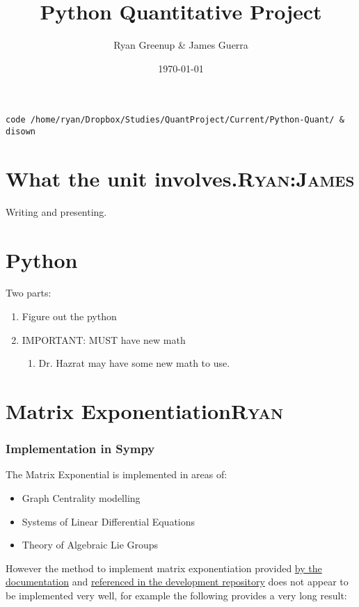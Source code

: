 \documentclass[11pt]{article}
\author{Ryan Greenup \& James Guerra}
\date{\today}
\title{Python Quantitative Project}
\begin{document}
\maketitle
\tableofcontents

\begin{verbatim}
code /home/ryan/Dropbox/Studies/QuantProject/Current/Python-Quant/ & disown
\end{verbatim}

\section[What the unit involves.]{What the unit involves.\hfill{}\textsc{Ryan:James}}
\label{sec:orge9798b6}
Writing and presenting.
\section{Python}
\label{sec:org0e3c86d}
Two parts:
\begin{enumerate}
\item Figure out the python
\item IMPORTANT: MUST have new math
\begin{enumerate}
\item Dr. Hazrat may have some new math to use.
\end{enumerate}
\end{enumerate}

\section[Matrix Exponentiation]{Matrix Exponentiation\hfill{}\textsc{Ryan}}
\label{sec:orgc027797}
\subsubsection{Implementation in Sympy}
\label{sec:org55a0578}
The Matrix Exponential is implemented in areas of:

\begin{itemize}
\item Graph Centrality modelling \cite{parkPowerWalkRevisiting2013}
\item Systems of Linear Differential Equations \cite[Ch. 8.4]{Zil2009}
\item Theory of Algebraic Lie Groups \cite[Ch. 2]{hallLieGroupsLie2015}
\end{itemize}

However the method to implement matrix exponentiation provided \href{https://docs.sympy.org/latest/tutorial/matrices.html}{by the documentation} \cite{MatricesSymPyDocumentation2020} and \href{https://github.com/sympy/sympy/issues/6218}{referenced in the development repository} \cite{MatrixExponentialIssue2019} does not appear to be implemented very well, for example the following provides a very long result:
\end{document}
